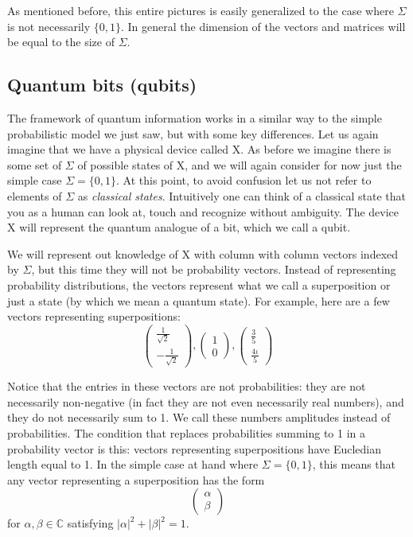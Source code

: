 \documentclass[12pt, oneside]{book}
\theoremstyle{definition}
\theoremstyle{definition}
\theoremstyle{remark}
\begin{document}
As mentioned before, this entire pictures is easily generalized to the case where $\Sigma$ is not necessarily $\{0,1\}$. In general the dimension of the vectors and matrices will be equal to the size of $\Sigma$.

\subsection{Quantum bits (qubits)}
The framework of quantum information works in a similar way to the simple probabilistic model we just saw, but with some key differences. Let us again imagine that we have a physical device called X. As before we imagine there is some set of $\Sigma$ of possible states of X, and we will again consider for now just the simple case $\Sigma=\{0,1\}$. At this point, to avoid confusion let us not refer to elements of $\Sigma$ as \textit{classical states}. Intuitively one can think of a classical state that you as a human can look at, touch and recognize without ambiguity. The device X will represent the quantum analogue of a bit, which we call a qubit.

We will represent out knowledge of X with column with column vectors indexed by $\Sigma$, but this time they will not be probability vectors. Instead of representing probability distributions, the vectors represent what we call a superposition or just a state (by which we mean a quantum state). For example, here are a few vectors representing superpositions:
\[
\begin{pmatrix} \frac{1}{\sqrt{2}} \\ -\frac{1}{\sqrt{2}} \end{pmatrix}, \begin{pmatrix} 1 \\ 0 \end{pmatrix}, \begin{pmatrix} \frac{3}{5} \\ \frac{4\iota}{5} \end{pmatrix}
\]

Notice that the entries in these vectors are not probabilities: they are not necessarily non-negative (in fact they are not even necessarily real numbers), and they do not necessarily sum to 1. We call these numbers amplitudes instead of probabilities. The condition that replaces probabilities summing to 1 in a probability vector is this: vectors representing superpositions have Eucledian length equal to 1. In the simple case at hand where $\Sigma = \{0,1\}$, this means that any vector representing a superposition has the form
\[
\begin{pmatrix} \alpha \\ \beta \end{pmatrix} 
\]
for $\alpha, \beta \in \mathbb{C}$ satisfying $|\alpha|^2+|\beta|^2=1$.
\end{document}
